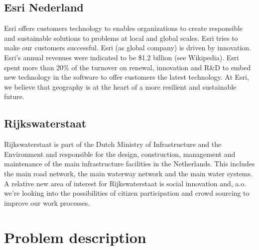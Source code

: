 \documentclass[a4paper,11pt]{article}
\begin{document}
\subsection*{Esri Nederland}

Esri offers customers technology to enables organizations to create responsible and sustainable solutions to problems at local and global scales. Esri tries to make our customers successful.
Esri (as global company) is driven by innovation.
Esri's annual revenues were indicated to be \$1.2 billion (see Wikipedia).
Esri spent more than 20\% of the turnover on renewal, innovation and R\&D to embed new technology in the software to offer customers the latest technology.
At Esri, we believe that geography is at the heart of a more resilient and sustainable future.

\subsection*{Rijkswaterstaat}

Rijkswaterstaat is part of the Dutch Ministry of Infrastructure and the Environment and responsible for the design, construction, management and maintenance of the main infrastructure facilities in the Netherlands. This includes the main road network, the main waterway network and the main water systems.
A relative new area of interest for Rijkswaterstaat is social innovation and, a.o. we're looking into the possibilities of citizen participation and crowd sourcing to improve our work processes.

\section{Problem description}
\end{document}
